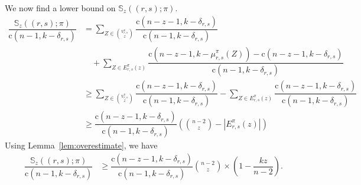 \documentclass{amsart}
\newcommand{\bb}{\mathbb}
\newcommand{\st}{\mathrm{c}}
\begin{document}
We now find a lower bound on $\bb{S}_{z}((r,s);\pi)$.
\begin{align*}
\dfrac{\bb{S}_{z}((r,s);\pi)}{\st(n-1,k-\delta_{r,s})}
& = \sum\limits_{Z \in \binom{V_{r,s}^{\pi}}{z}}\dfrac{\st(n-z-1,k-\delta_{r,s})}{\st(n-1,k-\delta_{r,s})}\\& \quad + \sum\limits_{Z \in E_{r,s}^{\pi}(z)} \dfrac{\st(n-z-1,k-\mu_{r,s}^{\pi}(Z)) - \st(n-z-1,k-\delta_{r,s}) }{\st(n-1,k-\delta_{r,s})} \\
&\geq \sum\limits_{Z \in \binom{V_{r,s}^{\pi}}{z}}\dfrac{\st(n-z-1,k-\delta_{r,s})}{\st(n-1,k-\delta_{r,s})}  -\sum\limits_{Z \in E_{r,s}^{\pi}(z)}\dfrac{\st(n-z-1,k-\delta_{r,s})}{\st(n-1,k-\delta_{r,s})}\\
&\geq \dfrac{{\st(n-z-1,k-\delta_{r,s})}}{\st(n-1,k-\delta_{r,s})}\left( \binom{n-2}{z}-\left|E_{r,s}^{\pi}(z)\right| \right)
\end{align*} 
Using Lemma~\ref{lem:overestimate}, we have 
\begin{align}\label{eq:bonflbint}
\dfrac{\bb{S}_{z}((r,s);\pi)}{\st(n-1,k-\delta_{r,s})} &\geq  \dfrac{{\st(n-z-1,k-\delta_{r,s})}}{{\st(n-1,k-\delta_{r,s})}} \binom{n-2}{z} \times \left(1-\dfrac{kz}{n-2} \right).
\end{align}
\end{document}
